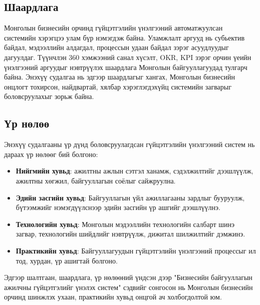 \subsection{Шаардлага}

Монголын бизнесийн орчинд гүйцэтгэлийн үнэлгээний автоматжуулсан системийн хэрэгцээ улам бүр нэмэгдэж байна. Уламжлалт аргууд нь 
субьектив байдал, мэдээллийн алдагдал, процессын удаан байдал зэрэг асуудлуудыг дагуулдаг. Түүнчлэн 360 хэмжээний санал хүсэлт, OKR, 
KPI зэрэг орчин үеийн үнэлгээний аргуудыг нэвтрүүлэх шаардлага Монголын байгууллагуудад тулгарч байна. Энэхүү судалгаа нь эдгээр шаардлагыг 
хангах, Монголын бизнесийн онцлогт тохирсон, найдвартай, хялбар хэрэглэгдэхүйц системийн загварыг боловсруулахыг зорьж байна.

\subsection{Үр нөлөө}

Энэхүү судалгааны үр дүнд боловсруулагдсан гүйцэтгэлийн үнэлгээний систем нь дараах үр нөлөөг бий болгоно:

\begin{itemize}
    \item \textbf{Нийгмийн хувьд}: ажилтны ажлын сэтгэл ханамж, сэдэлжилтийг дээшлүүлж, ажилтны хөгжил, байгууллагын соёлыг сайжруулна.
    \item \textbf{Эдийн засгийн хувьд}: Байгууллагын үйл ажиллагааны зардлыг бууруулж, бүтээмжийг нэмэгдүүлснээр эдийн засгийн үр ашгийг дээшлүүлнэ.
    \item \textbf{Технологийн хувьд}: Монголын мэдээллийн технологийн салбарт шинэ загвар, технологийн шийдлийг нэвтрүүлж, дижитал шилжилтийг дэмжинэ.
    \item \textbf{Практикийн хувьд}: Байгууллагуудын гүйцэтгэлийн үнэлгээний процессыг ил тод, хурдан, үр ашигтай болгоно.
\end{itemize}

Эдгээр шалтгаан, шаардлага, үр нөлөөний үндсэн дээр "Бизнесийн байгууллагын ажилчны гүйцэтгэлийг үнэлэх систем" сэдвийг сонгосон нь Монголын 
бизнесийн орчинд шинжлэх ухаан, практикийн хувьд онцгой ач холбогдолтой юм.
